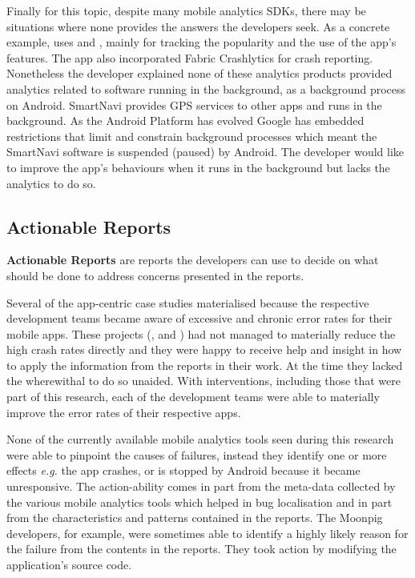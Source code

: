 Finally for this topic, despite many mobile analytics SDKs, there may be situations where none provides the answers the developers seek. As a concrete example,  uses  and , mainly for tracking the popularity and the use of the app's features. The app also incorporated Fabric Crashlytics for crash reporting. Nonetheless the developer explained none of these analytics products provided analytics related to software running in the background, as a background process on Android. SmartNavi provides GPS services to other apps and runs in the background. As the Android Platform has evolved Google has embedded restrictions that limit and constrain background processes which meant the SmartNavi software is suspended (paused) by Android. The developer would like to improve the app's behaviours when it runs in the background but lacks the analytics to do so.

\subsection{Actionable Reports}
\textbf{Actionable Reports} are reports the developers can use to decide on what should be done to address concerns presented in the reports. %

Several of the app-centric case studies materialised because the respective development teams became aware of excessive and chronic error rates for their mobile apps. %
These projects (,  and ) had not managed to materially reduce the high crash rates directly and they were happy to receive help and insight in how to apply the information from the reports in their work. At the time they lacked the wherewithal to do so unaided. With interventions, including those that were part of this research, each of the development teams were able to materially improve the error rates of their respective apps.

None of the currently available mobile analytics tools seen during this research were able to pinpoint the causes of failures, instead they identify one or more effects \emph{e.g.} the app crashes, or is stopped by Android because it became unresponsive. The action-ability comes in part from the meta-data collected by the various mobile analytics tools which helped in bug localisation and in part from the characteristics and patterns contained in the reports. The Moonpig developers, for example, were sometimes able to identify a highly likely reason for the failure from the contents in the reports. They took action by modifying the application's source code.

